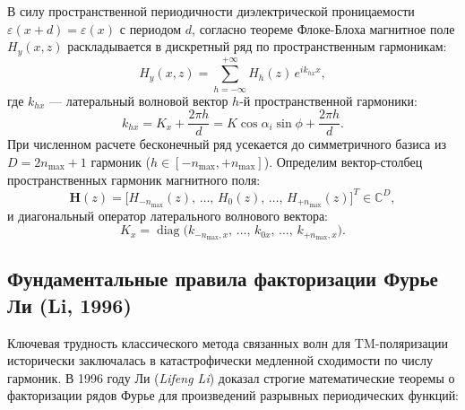 \documentclass[a4paper,11pt]{article}
\begin{document}
В силу пространственной периодичности диэлектрической проницаемости $\varepsilon(x + d) = \varepsilon(x)$ с периодом $d$, согласно теореме Флоке-Блоха магнитное поле $H_y(x, z)$ раскладывается в дискретный ряд по пространственным гармоникам:
\begin{equation}
    H_y(x, z) = \sum_{h = -\infty}^{+\infty} H_h(z) \, e^{i k_{hx} x},
    \label{eq:bloch_Hy}
\end{equation}
где $k_{hx}$ — латеральный волновой вектор $h$-й пространственной гармоники:
\begin{equation}
    k_{hx} = K_x + \frac{2\pi h}{d} = K \cos\alpha_i \sin\phi + \frac{2\pi h}{d}.
\end{equation}
При численном расчете бесконечный ряд усекается до симметричного базиса из $D = 2n_{\max} + 1$ гармоник ($h \in [-n_{\max}, +n_{\max}]$). Определим вектор-столбец пространственных гармоник магнитного поля:
\begin{equation}
    \mathbf{H}(z) = \big[ H_{-n_{\max}}(z), \, \dots, \, H_0(z), \, \dots, \, H_{+n_{\max}}(z) \big]^T \in \mathbb{C}^D,
\end{equation}
и диагональный оператор латерального волнового вектора:
\begin{equation}
    K_x = \operatorname{diag}\big( k_{-n_{\max}, x}, \, \dots, \, k_{0x}, \, \dots, \, k_{+n_{\max}, x} \big).
\end{equation}

\subsection{Фундаментальные правила факторизации Фурье Ли (Li, 1996)}

Ключевая трудность классического метода связанных волн для TM-поляризации исторически заключалась в катастрофически медленной сходимости по числу гармоник. В 1996 году Ли (\textit{Lifeng Li}) \cite{li1996} доказал строгие математические теоремы о факторизации рядов Фурье для произведений разрывных периодических функций:
\end{document}
